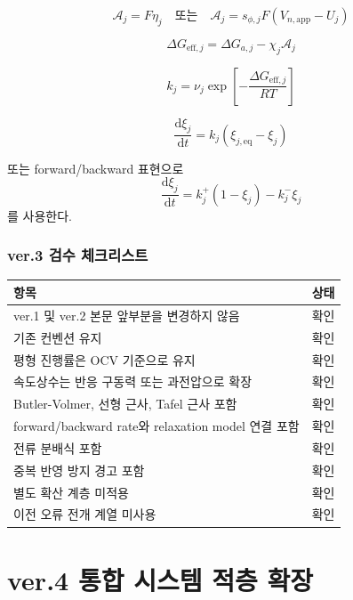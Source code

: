 \documentclass[11pt,a4paper]{article}
\newcommand{\dd}{\mathrm{d}}
\newcommand{\app}{\mathrm{app}}
\newcommand{\eff}{\mathrm{eff}}
\newcommand{\eq}{\mathrm{eq}}
\begin{document}
\begin{equation}
\mathcal A_j=F\eta_j
\quad \text{또는} \quad
\mathcal A_j=s_{\phi,j}F(V_{n,\app}-U_j)
\end{equation}

\begin{equation}
\Delta G_{\eff,j}=\Delta G_{a,j}-\chi_j\mathcal A_j
\end{equation}

\begin{equation}
k_j=\nu_j\exp\left[-\frac{\Delta G_{\eff,j}}{RT}\right]
\end{equation}

\begin{equation}
\frac{\dd\xi_j}{\dd t}=k_j(\xi_{j,\eq}-\xi_j)
\end{equation}

또는 forward/backward 표현으로
\begin{equation}
\frac{\dd\xi_j}{\dd t}=k_j^+(1-\xi_j)-k_j^-\xi_j
\end{equation}
를 사용한다.

\section{ver.3 검수 체크리스트}
\begin{longtable}{p{}p{}}
\toprule
항목 & 상태 \\
\midrule
\endhead
ver.1 및 ver.2 본문 앞부분을 변경하지 않음 & 확인 \\
기존 컨벤션 유지 & 확인 \\
평형 진행률은 OCV 기준으로 유지 & 확인 \\
속도상수는 반응 구동력 또는 과전압으로 확장 & 확인 \\
Butler-Volmer, 선형 근사, Tafel 근사 포함 & 확인 \\
forward/backward rate와 relaxation model 연결 포함 & 확인 \\
전류 분배식 포함 & 확인 \\
중복 반영 방지 경고 포함 & 확인 \\
별도 확산 계층 미적용 & 확인 \\
이전 오류 전개 계열 미사용 & 확인 \\
\bottomrule
\end{longtable}



\newpage
\part*{ver.4 통합 시스템 적층 확장}
\end{document}
